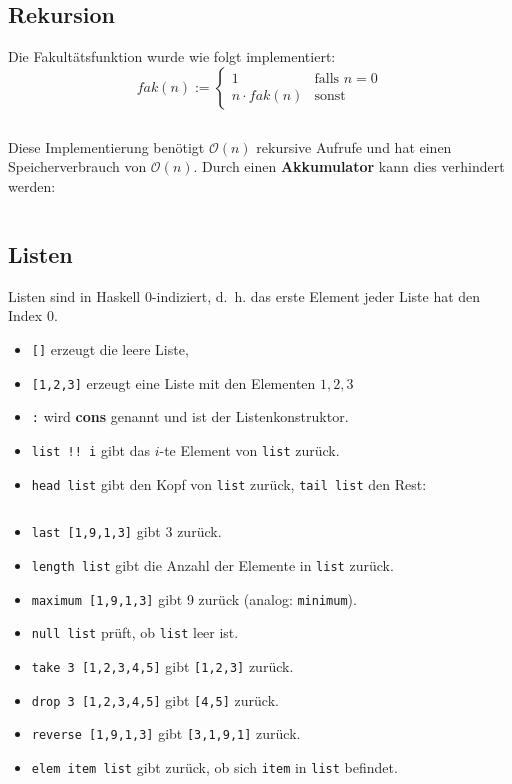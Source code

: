 \inputminted[numbersep=5pt, tabsize=4]{haskell}{scripts/haskell/binomialkoeffizient-guard.hs}

\subsection{Rekursion}
Die Fakultätsfunktion wurde wie folgt implementiert:
\[fak(n) := \begin{cases}
        1              &\text{falls } n=0\\
        n \cdot fak(n) &\text{sonst}
    \end{cases}\]
\inputminted[numbersep=5pt, tabsize=4]{haskell}{scripts/haskell/fakultaet.hs}

Diese Implementierung benötigt $\mathcal{O}(n)$ rekursive Aufrufe und
hat einen Speicherverbrauch von $\mathcal{O}(n)$. Durch einen
\textbf{Akkumulator} kann dies verhindert werden:
\inputminted[numbersep=5pt, tabsize=4]{haskell}{scripts/haskell/fakultaet-akkumulator.hs}

\subsection{Listen}
Listen sind in Haskell 0-indiziert, d.~h. das erste Element jeder Liste hat
den Index 0.

\begin{itemize}
    \item \texttt{[]} erzeugt die leere Liste,
    \item \texttt{[1,2,3]} erzeugt eine Liste mit den Elementen $1, 2, 3$
    \item \texttt{:} wird \textbf{cons} genannt und ist
          der Listenkonstruktor.
    \item \texttt{list !! i} gibt das $i$-te Element von \texttt{list} zurück.
    \item \texttt{head list} gibt den Kopf von \texttt{list} zurück,
          \texttt{tail list} den Rest:
          \inputminted[numbersep=5pt, tabsize=4]{haskell}{scripts/haskell/list-basic.sh}
    \item \texttt{last [1,9,1,3]} gibt 3 zurück.
    \item \texttt{length list} gibt die Anzahl der Elemente in \texttt{list} zurück.
    \item \texttt{maximum [1,9,1,3]} gibt 9 zurück (analog: \texttt{minimum}).
    \item \texttt{null list} prüft, ob \texttt{list} leer ist.
    \item \texttt{take 3 [1,2,3,4,5]} gibt \texttt{[1,2,3]} zurück.
    \item \texttt{drop 3 [1,2,3,4,5]} gibt \texttt{[4,5]} zurück.
    \item \texttt{reverse [1,9,1,3]} gibt \texttt{[3,1,9,1]} zurück.
    \item \texttt{elem item list} gibt zurück, ob sich \texttt{item} in \texttt{list} befindet.
\end{itemize}

